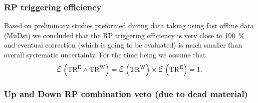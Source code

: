 \subsubsection{RP triggering efficiency}\label{sec:rpTrigEff}

Based on preliminary studies preformed during data taking using fast offline data (MuDst) we concluded that the RP triggering efficiency is very close to 100~\% and eventual correction (which is going to be evaluated) is much smaller than overall systematic uncertainty. For the time being we assume that
\begin{equation}
\mbox{\LARGE$\varepsilon$}\left(\TRE\land\TRW\right) =  \mbox{\LARGE$\varepsilon$}\left(\TRW\right) \times \mbox{\LARGE$\varepsilon$}\left(\TRE\right) = 1.
\end{equation}


% 


\subsubsection{Up and Down RP combination veto (due to dead material)}\label{sec:rpDeadMat}

